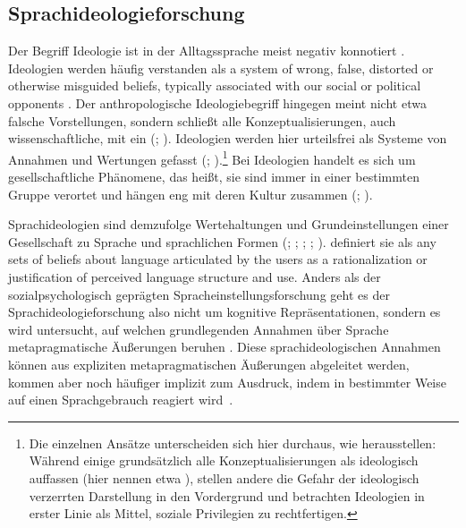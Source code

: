 \subsection{Sprachideologieforschung}
\label{sec:Sprachideologieforschung}
Der Begriff Ideologie ist in der Alltagssprache meist negativ konnotiert \citep[s.][124--127]{Silverstein1998}. Ideologien werden häufig verstanden als \glqq a system of wrong, false, distorted or otherwise misguided beliefs, typically associated with our social or political opponents\grqq{} \citep[2]{vanDijk.1998}. 
Der anthropologische Ideologiebegriff hingegen meint nicht etwa falsche Vorstellungen, sondern schließt alle Konzeptualisierungen, auch wissenschaftliche, mit ein (\citealp[s.][312]{Silverstein1992}; \citeyear[124]{Silverstein1998}). 
Ideologien werden hier urteilsfrei als Systeme von Annahmen und Wertungen gefasst (\citealp[s.][3]{vanDijk.1998}; \citealp[12]{Gal.2019}).\footnote{Die einzelnen Ansätze unterscheiden sich hier durchaus, wie \citet[56--57]{Woolard1994} herausstellen: Während einige grundsätzlich alle Konzeptualisierungen als ideologisch auffassen (hier nennen \citeauthor{Woolard1994} etwa \citealp{Rumsey.1990}), stellen andere die Gefahr der ideologisch verzerrten Darstellung in den Vordergrund und betrachten Ideologien in erster Linie als Mittel, soziale Privilegien zu rechtfertigen.} 
Bei Ideologien handelt es sich um gesellschaftliche Phänomene, das heißt, sie sind immer in einer bestimmten Gruppe verortet und hängen eng mit deren Kultur zusammen (\citealp[s.][312]{Silverstein1992}; \citealp[3]{vanDijk.1998}).

Sprachideologien sind demzufolge Wertehaltungen und Grundeinstellungen einer Gesellschaft zu Sprache und sprachlichen Formen (\citealp[s.][]{Silverstein1979}; \citeyear{Silverstein1992}; \citeyear{Silverstein1998}; \citealp{Kroskrity.2010}; \citealp{Spitzmuller2013}). 
\citet[193]{Silverstein1979} definiert sie als \glqq any sets of beliefs about language articulated by the users as a rationalization or justification of perceived language structure and use\grqq{}. 
Anders als der sozialpsychologisch geprägten Spracheinstellungsforschung geht es der Sprachideologieforschung also nicht um kognitive Repräsentationen, sondern es wird untersucht, auf welchen grundlegenden Annahmen über Sprache metapragmatische Äußerungen beruhen \citep[s.][223]{Silverstein.1985}. 
Diese sprachideologischen Annahmen können aus expliziten metapragmatischen {\"A}u{\ss}erungen abgeleitet werden, kommen aber noch h{\"a}ufiger implizit zum Ausdruck, indem in bestimmter Weise auf einen Sprachgebrauch reagiert wird~\citep[s.][116]{Gal.2016}.

